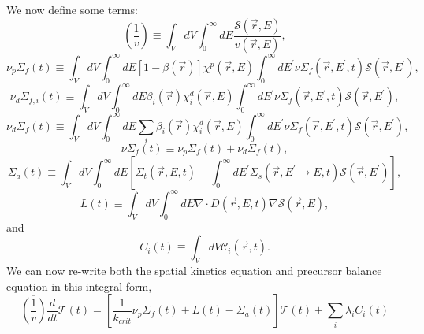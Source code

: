 \documentclass{ansconf}
\numberwithin{equation}{section}
\begin{document}
 We now define some terms:
\begin{equation}
\overline{\left(\frac{1}{v}\right)}\equiv\int_{V}dV\int_{0}^{\infty}dE\frac{\mathcal{S}\left(\vec{r},E\right)}{v\left(\vec{r},E\right)},
\end{equation}
\begin{equation}
\nu_{p}\Sigma_{f}\left(t\right)\equiv\int_{V}dV\int_{0}^{\infty}dE\left[1-\beta
\left(\vec{r}\right)\right]\chi^{p}\left(\vec{r},E\right)\int_{0}^{\infty}dE^{\prime}
\nu\Sigma_{f}\left(\vec{r},E^{\prime},t\right)\mathcal{S}\left(\vec{r},E^{\prime}\right),
\end{equation}
\begin{equation}
\nu_{d}\Sigma_{f,i}\left(t\right)\equiv\int_{V}dV\int_{0}^{\infty}dE\beta_{i}
\left(\vec{r}\right)\chi_{i}^{d}\left(\vec{r},E\right)\int_{0}^{\infty}dE^{\prime}
\nu\Sigma_{f}\left(\vec{r},E^{\prime},t\right)\mathcal{S}\left(\vec{r},E^{\prime}\right),
\end{equation}
\begin{equation}
\nu_{d}\Sigma_{f}\left(t\right)\equiv\int_{V}dV\int_{0}^{\infty}dE\sum_{i}
\beta_{i}\left(\vec{r}\right)\chi_{i}^{d}\left(\vec{r},E\right)\int_{0}^{\infty}dE^{\prime}
\nu\Sigma_{f}\left(\vec{r},E^{\prime},t\right)\mathcal{S}\left(\vec{r},E^{\prime}\right),
\end{equation}
\begin{equation}
\nu\Sigma_{f}\left(t\right)\equiv\nu_{p}\Sigma_{f}\left(t\right)+\nu_{d}\Sigma_{f}\left(t\right),
\end{equation}
\begin{equation}
\Sigma_{a}\left(t\right)\equiv\int_{V}dV\int_{0}^{\infty}dE\left[\Sigma_{t}
\left(\vec{r},E,t\right)-\int_{0}^{\infty}dE^{\prime}\Sigma_{s}\left(\vec{r},E^{\prime}\rightarrow E,t\right)\mathcal{S}\left(\vec{r},E^{\prime}\right)\right],
\end{equation}
\begin{equation}
L\left(t\right)\equiv\int_{V}dV\int_{0}^{\infty}dE\nabla\cdot D\left(\vec{r},E,t\right)\nabla\mathcal{S}\left(\vec{r},E\right),
\end{equation}
and
\begin{equation}
C_{i}\left(t\right)\equiv\int_{V}dV\mathcal{C}_{i}\left(\vec{r},t\right).
\end{equation}
 We can now re-write both the spatial kinetics equation and precursor
balance equation in this integral form,
\begin{equation}
\overline{\left(\frac{1}{v}\right)}\frac{d}{dt}\mathcal{T}\left(t\right)=\left[\frac{1}{k_{crit}}\nu_{p}\Sigma_{f}\left(t\right)+L\left(t\right)-\Sigma_{a}\left(t\right)\right]
\mathcal{T}\left(t\right)+\sum_{i}\lambda_{i}C_{i}\left(t\right)
\end{equation}
\end{document}
